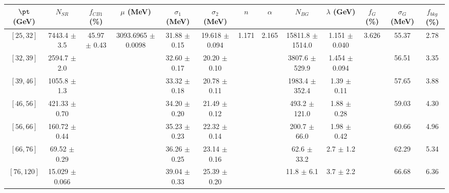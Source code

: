 \begin{tabular}{c||c|c|c|c|c|c|c|c|c|c|c||c}
$\pt$ (GeV) & $N_{SR}$ & $f_{CB1}$ (\%) & $\mu$ (MeV) & $\sigma_1$ (MeV) & $\sigma_2$ (MeV) & $n$ & $\alpha$ & $N_{BG}$ & $\lambda$ (GeV) & $f_G$ (\%) & $\sigma_G$ (MeV) & $f_{bkg}$ (\%) \\
\hline
$[25, 32]$ & 7443.4 $\pm$ 3.5 & \multirow{7}{*}{45.97 $\pm$ 0.43} & \multirow{7}{*}{3093.6965 $\pm$ 0.0098} & 31.88 $\pm$ 0.15 & 19.618 $\pm$ 0.094 & \multirow{7}{*}{1.171} & \multirow{7}{*}{2.165} & 15811.8 $\pm$ 1514.0 & 1.151 $\pm$ 0.040 & \multirow{7}{*}{3.626} & 55.37 & 2.78\\
$[32, 39]$ & 2594.7 $\pm$ 2.0 &  &  & 32.60 $\pm$ 0.17 & 20.20 $\pm$ 0.10 &  &  & 3807.6 $\pm$ 529.9 & 1.454 $\pm$ 0.094 &  & 56.51 & 3.35\\
$[39, 46]$ & 1055.8 $\pm$ 1.3 &  &  & 33.32 $\pm$ 0.18 & 20.78 $\pm$ 0.11 &  &  & 1983.4 $\pm$ 352.4 & 1.39 $\pm$ 0.11 &  & 57.65 & 3.88\\
$[46, 56]$ & 421.33 $\pm$ 0.70 &  &  & 34.20 $\pm$ 0.20 & 21.49 $\pm$ 0.12 &  &  & 493.2 $\pm$ 121.0 & 1.88 $\pm$ 0.28 &  & 59.03 & 4.30\\
$[56, 66]$ & 160.72 $\pm$ 0.44 &  &  & 35.23 $\pm$ 0.23 & 22.32 $\pm$ 0.14 &  &  & 200.7 $\pm$ 66.0 & 1.98 $\pm$ 0.42 &  & 60.66 & 4.96\\
$[66, 76]$ & 69.52 $\pm$ 0.29 &  &  & 36.26 $\pm$ 0.25 & 23.14 $\pm$ 0.16 &  &  & 62.6 $\pm$ 33.2 & 2.7 $\pm$ 1.2 &  & 62.29 & 5.34\\
$[76, 120]$ & 15.029 $\pm$ 0.066 &  &  & 39.04 $\pm$ 0.33 & 25.39 $\pm$ 0.20 &  &  & 11.8 $\pm$ 6.1 & 3.7 $\pm$ 2.2 &  & 66.68 & 6.36\\
\end{tabular}
